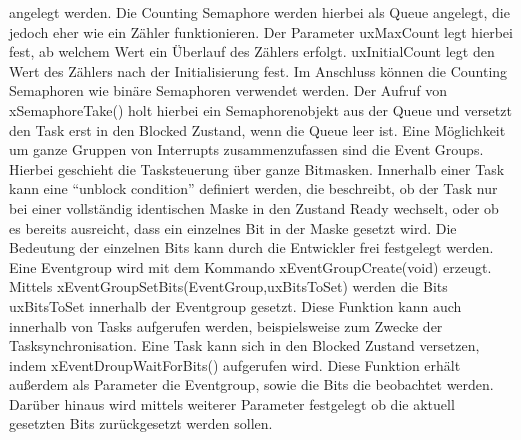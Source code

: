 angelegt werden. Die Counting Semaphore werden hierbei als Queue angelegt, die jedoch eher wie ein Zähler funktionieren. Der Parameter uxMaxCount legt hierbei fest, ab welchem Wert ein Überlauf des Zählers erfolgt. uxInitialCount legt den Wert des Zählers nach der Initialisierung fest. Im Anschluss können die Counting Semaphoren wie binäre Semaphoren verwendet werden. Der Aufruf von xSemaphoreTake() holt hierbei ein Semaphorenobjekt aus der Queue und versetzt den Task erst in den Blocked Zustand, wenn die Queue leer ist.
Eine Möglichkeit um ganze Gruppen von Interrupts zusammenzufassen sind die Event Groups. Hierbei geschieht die Tasksteuerung über ganze Bitmasken. Innerhalb einer Task kann eine "`unblock condition"' definiert werden, die beschreibt, ob der Task nur bei einer vollständig identischen Maske in den Zustand Ready wechselt, oder ob es bereits ausreicht, dass ein einzelnes Bit in der Maske gesetzt wird. Die Bedeutung der einzelnen Bits kann durch die Entwickler frei festgelegt werden. Eine Eventgroup wird mit dem Kommando xEventGroupCreate(void) erzeugt. Mittels xEventGroupSetBits(EventGroup,uxBitsToSet) werden die Bits uxBitsToSet innerhalb der Eventgroup gesetzt. Diese Funktion kann auch innerhalb von Tasks aufgerufen werden, beispielsweise zum Zwecke der Tasksynchronisation. Eine Task kann sich in den Blocked Zustand versetzen, indem xEventDroupWaitForBits() aufgerufen wird. Diese Funktion erhält außerdem als Parameter die Eventgroup, sowie die Bits die beobachtet werden. Darüber hinaus wird mittels weiterer Parameter festgelegt ob die aktuell gesetzten Bits zurückgesetzt werden sollen.